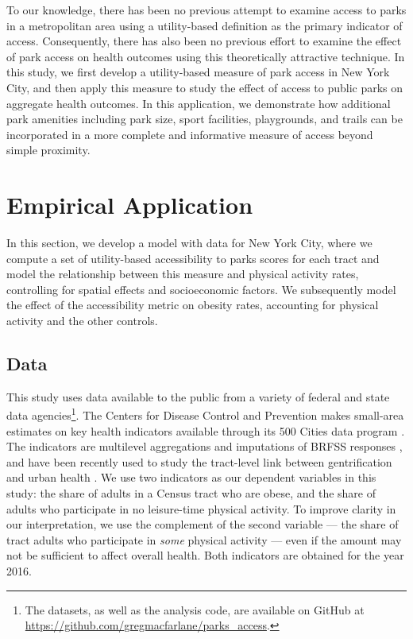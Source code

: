 \documentclass[Crown,sageh.bst]{sagej}
\begin{document}
To our knowledge, there has been no previous attempt to examine access
to parks in a metropolitan area using a utility-based definition as the
primary indicator of access. Consequently, there has also been no
previous effort to examine the effect of park access on health outcomes
using this theoretically attractive technique. In this study, we first
develop a utility-based measure of park access in New York City, and
then apply this measure to study the effect of access to public parks on
aggregate health outcomes. In this application, we demonstrate how
additional park amenities including park size, sport facilities,
playgrounds, and trails can be incorporated in a more complete and
informative measure of access beyond simple proximity.

\hypertarget{empirical-application}{%
\section{Empirical Application}\label{empirical-application}}

In this section, we develop a model with data for New York City, where
we compute a set of utility-based accessibility to parks scores for each
tract and model the relationship between this measure and physical
activity rates, controlling for spatial effects and socioeconomic
factors. We subsequently model the effect of the accessibility metric on
obesity rates, accounting for physical activity and the other controls.

\hypertarget{data}{%
\subsection{Data}\label{data}}

This study uses data available to the public from a variety of federal
and state data agencies\footnote{The datasets, as well as the analysis
  code, are available on GitHub at
  \url{https://github.com/gregmacfarlane/parks_access}.}. The Centers
for Disease Control and Prevention makes small-area estimates on key
health indicators available through its 500 Cities data program
\citep{CDC5002016}. The indicators are multilevel aggregations and
imputations of BRFSS responses \citep{Wang2018, Wang2017}, and have been
recently used to study the tract-level link between gentrification and
urban health \citep{Gibbons2018}. We use two indicators as our dependent
variables in this study: the share of adults in a Census tract who are
obese, and the share of adults who participate in no leisure-time
physical activity. To improve clarity in our interpretation, we use the
complement of the second variable --- the share of tract adults who
participate in \emph{some} physical activity --- even if the amount may
not be sufficient to affect overall health. Both indicators are obtained
for the year 2016.
\end{document}
